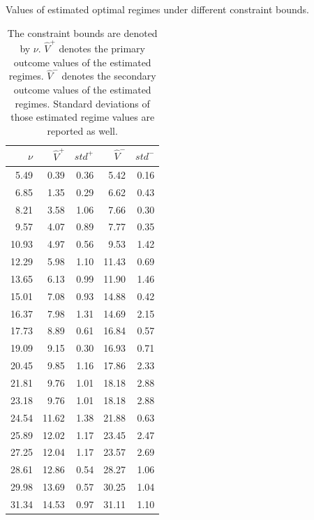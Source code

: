 \documentclass{article}
\newcommand{\wh}{\widehat}
\begin{document}
%		
\begin{table}[!htbp]
\caption{Values of estimated optimal regimes under different constraint bounds.}
	\centering
\begin{tabular}{rrrrr}\hline 
	$\nu$  & $\widehat{V}^{+}$ & $std^{+}$ & $\widehat{V}^{-}$ & $std^{-}$ \\\hline 
	5.49 &     0.39 &     0.36 &     5.42  &     0.16 \\ 
	6.85 &     1.35 &     0.29 &     6.62  &     0.43 \\ 
	8.21 &     3.58 &     1.06 &     7.66  &     0.30 \\ 
	9.57 &     4.07 &     0.89 &     7.77  &     0.35 \\ 
	10.93 &     4.97 &     0.56 &     9.53  &     1.42 \\ 
	12.29 &     5.98 &     1.10 &    11.43  &     0.69 \\ 
	13.65 &     6.13 &     0.99 &    11.90  &     1.46 \\ 
	15.01 &     7.08 &     0.93 &    14.88  &     0.42 \\ 
	16.37 &     7.98 &     1.31 &    14.69  &     2.15 \\ 
	17.73 &     8.89 &     0.61 &    16.84  &     0.57 \\ 
	19.09 &     9.15 &     0.30 &    16.93  &     0.71 \\ 
	20.45 &     9.85 &     1.16 &    17.86  &     2.33 \\ 
	21.81 &     9.76 &     1.01 &    18.18  &     2.88 \\ 
	23.18 &     9.76 &     1.01 &    18.18  &     2.88 \\ 
	24.54 &    11.62 &     1.38 &    21.88  &     0.63 \\ 
	25.89 &    12.02 &     1.17 &    23.45  &     2.47 \\ 
	27.25 &    12.04 &     1.17 &    23.57  &     2.69 \\ 
	28.61 &    12.86 &     0.54 &    28.27  &     1.06 \\ 
	29.98 &    13.69 &     0.57 &    30.25  &     1.04 \\ 
	31.34 &    14.53 &     0.97 &    31.11  &     1.10 \\ \hline 
\end{tabular}
\caption*{The constraint bounds are denoted by $\nu$. $\wh{V}^{+}$ denotes the primary outcome values of the estimated regimes. $\wh{V}^{-}$ denotes the secondary outcome values of the estimated regimes. Standard deviations of those estimated regime values are reported as well.}
\end{table} 
\end{document}
